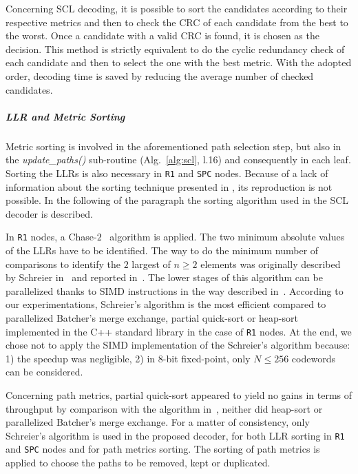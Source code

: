 Concerning SCL decoding, it is possible to sort the candidates according to
their respective metrics and then to check the CRC of each candidate from the
best to the worst. Once a candidate with a valid CRC is found, it is chosen as
the decision. This method is strictly equivalent to do the cyclic redundancy
check of each candidate and then to select the one with the best metric. With
the adopted order, decoding time is saved by reducing the average number of
checked candidates.

\subparagraph{LLR and Metric Sorting}
\label{subsec:sorting}

Metric sorting is involved in the aforementioned path selection step, but also
in the \textit{update\_paths()} sub-routine (Alg.~\ref{alg:scl}, l.16) and
consequently in each leaf. Sorting the LLRs is also necessary in \texttt{R1} and
\texttt{SPC} nodes. Because of a lack of information about the sorting technique
presented in \cite{Sarkis2016}, its reproduction is not possible. In the
following of the paragraph the sorting algorithm used in the SCL decoder is
described.

In \texttt{R1} nodes, a Chase-$2$~\cite{Chase1972} algorithm is applied. The two
minimum absolute values of the LLRs have to be identified. The way to do the
minimum number of comparisons to identify the $2$ largest of $n\geq2$ elements
was originally described by Schreier in~\cite{Schreier1932} and reported
in~\cite{Knuth1973}. The lower stages of this algorithm can be parallelized
thanks to SIMD instructions in the way described in~\cite{Furtak2007}. According
to our experimentations, Schreier's algorithm is the most efficient compared to
parallelized Batcher's merge exchange, partial quick-sort or heap-sort
implemented in the C++ standard library in the case of \texttt{R1} nodes. At the
end, we chose not to apply the SIMD implementation of the Schreier's algorithm
because: 1) the speedup was negligible, 2) in 8-bit fixed-point, only
$N \leq 256$ codewords can be considered.

Concerning path metrics, partial quick-sort appeared to yield no gains in terms
of throughput by comparison with the algorithm in~\cite{Schreier1932}, neither
did heap-sort or parallelized Batcher's merge exchange. For a matter of
consistency, only Schreier's algorithm is used in the proposed decoder, for both
LLR sorting in \texttt{R1} and \texttt{SPC} nodes and for path metrics sorting.
The sorting of path metrics is applied to choose the paths to be removed, kept
or duplicated.

